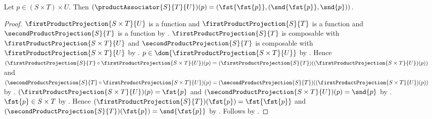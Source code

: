 \begin{proposition}\label{product_associator_apply}
    Let $p\in(S\times T)\times U$.
    Then $(\productAssociator{S}{T}{U})(p)
        =(\fst{\fst{p}},(\snd{\fst{p}},\snd{p}))$.
\end{proposition}
\begin{proof}
    $\firstProductProjection{S\times T}{U}$ is a function and
        $\firstProductProjection{S}{T}$ is a function and
        $\secondProductProjection{S}{T}$ is a function by
        .
    $\firstProductProjection{S}{T}$ is composable with
        $\firstProductProjection{S\times T}{U}$ and
        $\secondProductProjection{S}{T}$ is composable with
        $\firstProductProjection{S\times T}{U}$ by
        .
    $p\in\dom{\firstProductProjection{S\times T}{U}}$ by
        .
    Hence $(\firstProductProjection{S}{T}\circ
        \firstProductProjection{S\times T}{U})(p)
        =(\firstProductProjection{S}{T})
            ((\firstProductProjection{S\times T}{U})(p))$ and
        $(\secondProductProjection{S}{T}\circ
        \firstProductProjection{S\times T}{U})(p)
        =(\secondProductProjection{S}{T})
            ((\firstProductProjection{S\times T}{U})(p))$ by
        .
    $(\firstProductProjection{S\times T}{U})(p)=\fst{p}$ and
        $(\secondProductProjection{S\times T}{U})(p)=\snd{p}$ by
        .
    $\fst{p}\in S\times T$ by .
    Hence $(\firstProductProjection{S}{T})(\fst{p})
        =\fst{\fst{p}}$ and
        $(\secondProductProjection{S}{T})(\fst{p})
        =\snd{\fst{p}}$ by
        .
    Follows by
        .
\end{proof}

